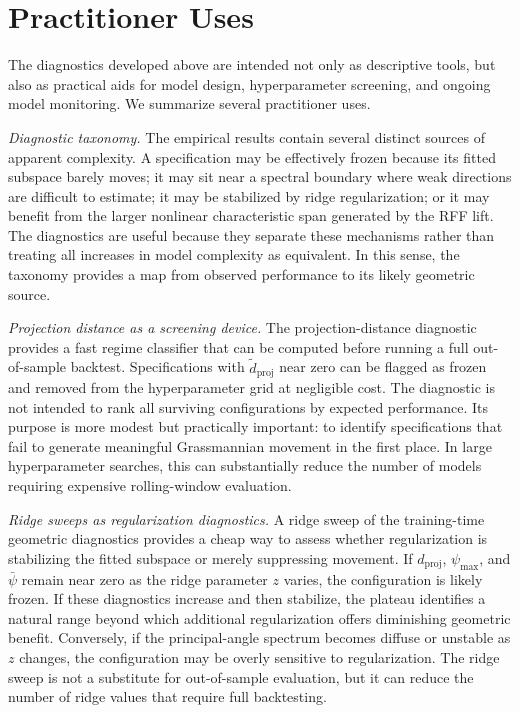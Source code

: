 \documentclass[11pt,letterpaper]{article}
\begin{document}
\section{Practitioner Uses}
\label{sec:pract_use}

The diagnostics developed above are intended not only as descriptive tools, but also as practical aids for model design, hyperparameter screening, and ongoing model monitoring. We summarize several practitioner uses.

\smallskip\noindent
\textit{Diagnostic taxonomy.} The empirical results contain several distinct sources of apparent complexity. A specification may be effectively frozen because its fitted subspace barely moves; it may sit near a spectral boundary where weak directions are difficult to estimate; it may be stabilized by ridge regularization; or it may benefit from the larger nonlinear characteristic span generated by the RFF lift. The diagnostics are useful because they separate these mechanisms rather than treating all increases in model complexity as equivalent. In this sense, the taxonomy provides a map from observed performance to its likely geometric source.

\smallskip\noindent 
\textit{Projection distance as a screening device.} The projection-distance diagnostic provides a fast regime classifier that can be computed before running a full out-of-sample backtest. Specifications with $\widetilde d_{\mathrm{proj}}$ near zero can be flagged as frozen and removed from the hyperparameter grid at negligible cost. The diagnostic is not intended to rank all surviving configurations by expected performance. Its purpose is more modest but practically important: to identify specifications that fail to generate meaningful Grassmannian movement in the first place. In large hyperparameter searches, this can substantially reduce the number of models requiring expensive rolling-window evaluation.

\smallskip\noindent
\textit{Ridge sweeps as regularization diagnostics.} A ridge sweep of the training-time geometric diagnostics provides a cheap way to assess whether regularization is stabilizing the fitted subspace or merely suppressing movement. If $d_{\mathrm{proj}}$, $\psi_{\max}$, and $\bar\psi$ remain near zero as the ridge parameter $z$ varies, the configuration is likely frozen. If these diagnostics increase and then stabilize, the plateau identifies a natural range beyond which additional
regularization offers diminishing geometric benefit. Conversely, if the principal-angle spectrum becomes diffuse or unstable as $z$ changes, the configuration may be overly sensitive to regularization. The ridge sweep is not a substitute for out-of-sample evaluation, but it can reduce the number of ridge values that require full backtesting.
\end{document}
